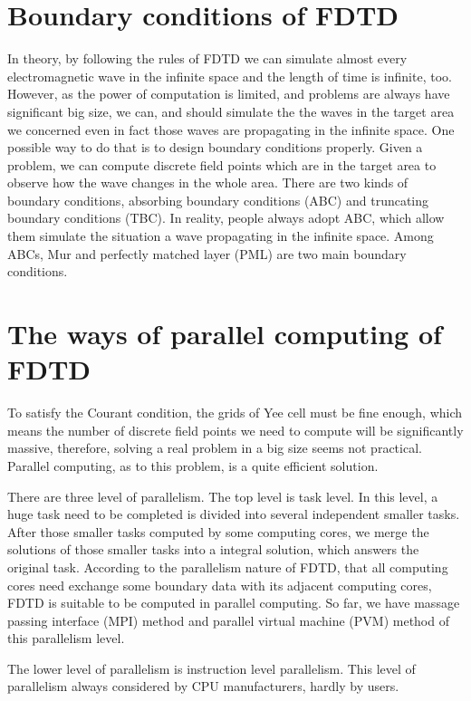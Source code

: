 \section{Boundary conditions of FDTD}
In theory, by following the rules of FDTD we can simulate almost every electromagnetic wave in the infinite space and the length of time is infinite, too. However, as the power of computation is limited, and problems are always have significant big size, we can, and should simulate the the waves in the target area we concerned even in fact those waves are propagating in the infinite space. One possible way to do that is to design boundary conditions properly. Given a problem, we can compute discrete field points which are in the target area to observe how the wave changes in the whole area. There are two kinds of boundary conditions, absorbing boundary conditions (ABC) and truncating boundary conditions (TBC). In reality, people always adopt ABC, which allow them simulate the situation a wave propagating in the infinite space. Among ABCs, Mur and perfectly matched layer (PML) are two main boundary conditions.

\section{The ways of parallel computing of FDTD}

To satisfy the Courant condition, the grids of Yee cell must be fine enough, which means the number of discrete field points we need to compute will be significantly massive, therefore, solving a real problem in a big size seems not practical. Parallel computing, as to this problem, is a quite efficient solution.

There are three level of parallelism. The top level is task level. In this level, a huge task need to be completed is divided into several independent smaller tasks. After those smaller tasks computed by some computing cores, we merge the solutions of those smaller tasks into a integral solution, which answers the original task. According to the parallelism nature of FDTD, that all computing cores need exchange some boundary data with its adjacent computing cores, FDTD is suitable to be computed in parallel computing. So far, we have massage passing interface (MPI) method and parallel virtual machine (PVM) method of this parallelism level.

The lower level of parallelism is instruction level parallelism. This level of parallelism always considered by CPU manufacturers, hardly by users.

